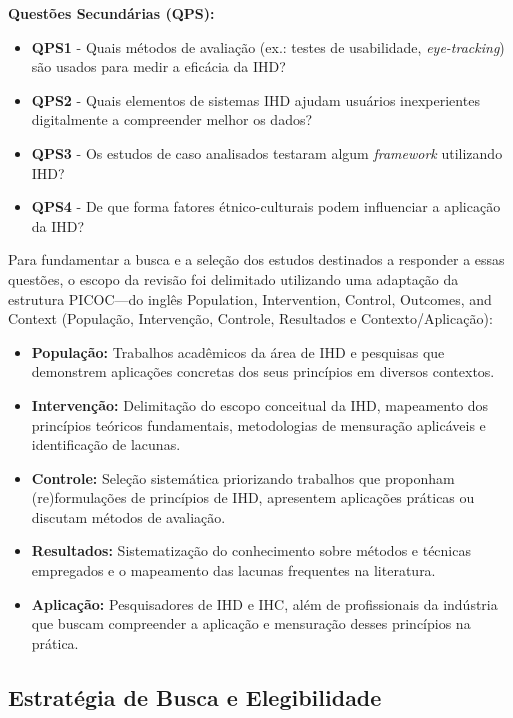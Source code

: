 \documentclass[12pt]{article}
\begin{document}
\textbf{Questões Secundárias (QPS):}
\begin{itemize}
\item \textbf{QPS1} - Quais métodos de avaliação (ex.: testes de usabilidade, \textit{eye-tracking}) são usados para medir a eficácia da IHD?
\item \textbf{QPS2} - Quais elementos de sistemas IHD ajudam usuários inexperientes digitalmente a compreender melhor os dados?
\item \textbf{QPS3} - Os estudos de caso analisados testaram algum \textit{framework} utilizando IHD?
\item \textbf{QPS4} - De que forma fatores étnico-culturais podem influenciar a aplicação da IHD?
\end{itemize}

Para fundamentar a busca e a seleção dos estudos destinados a responder a essas questões, o escopo da revisão foi delimitado utilizando uma adaptação da estrutura PICOC---do inglês Population, Intervention, Control, Outcomes, and Context (População, Intervenção, Controle, Resultados e Contexto/Aplicação):

\begin{itemize}
\item \textbf{População:} Trabalhos acadêmicos da área de IHD e pesquisas que demonstrem aplicações concretas dos seus princípios em diversos contextos.
\item \textbf{Intervenção:} Delimitação do escopo conceitual da IHD, mapeamento dos princípios teóricos fundamentais, metodologias de mensuração aplicáveis e identificação de lacunas.
\item \textbf{Controle:} Seleção sistemática priorizando trabalhos que proponham (re)formulações de princípios de IHD, apresentem aplicações práticas ou discutam métodos de avaliação.
\item \textbf{Resultados:} Sistematização do conhecimento sobre métodos e técnicas empregados e o mapeamento das lacunas frequentes na literatura.
\item \textbf{Aplicação:} Pesquisadores de IHD e IHC, além de profissionais da indústria que buscam compreender a aplicação e mensuração desses princípios na prática.
\end{itemize}

\subsection{Estratégia de Busca e Elegibilidade}
\label{estrategiaDeBusca}
\end{document}
